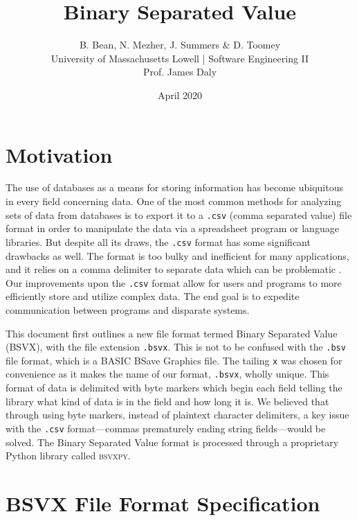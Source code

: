 \documentclass[10pt]{article}
\begin{document}
\title{Binary Separated Value}
\author{B. Bean, N. Mezher, J. Summers \& D. Toomey\\University of Massachusetts Lowell | Software Engineering II\\Prof. James Daly}
\date{April 2020}
\maketitle

\section*{Motivation}

The use of databases as a means for storing information has become ubiquitous in every field concerning data.
One of the most common methods for analyzing sets of data from databases is to export it to a \texttt{.csv} (comma separated value) file format in order to manipulate the data via a spreadsheet program or language libraries.
But despite all its draws, the \texttt{.csv} format has some significant drawbacks as well.
The format is too bulky and inefficient for many applications, and it relies on a comma delimiter to separate data which can be problematic \cite{Coleman2011}.
Our improvements upon the \texttt{.csv} format allow for users and programs to more efficiently store and utilize complex data.
The end goal is to expedite communication between programs and disparate systems.

\indent{}
This document first outlines a new file format termed Binary Separated Value (BSVX), with the file extension \texttt{.bsvx}.
This is not to be confused with the \texttt{.bsv} file format, which is a BASIC BSave Graphics file.
The tailing \texttt{x} was chosen for convenience as it makes the name of our format, \texttt{.bsvx}, wholly unique.
This format of data is delimited with byte markers which begin each field telling the library what kind of data is in the field and how long it is.
We believed that through using byte markers, instead of plaintext character delimiters, a key issue with the \texttt{.csv} format---commas prematurely ending string fields---would be solved.
The Binary Separated Value format is processed through a proprietary Python library called \textsc{bsvxpy}.

\section*{BSVX File Format Specification}
\end{document}
